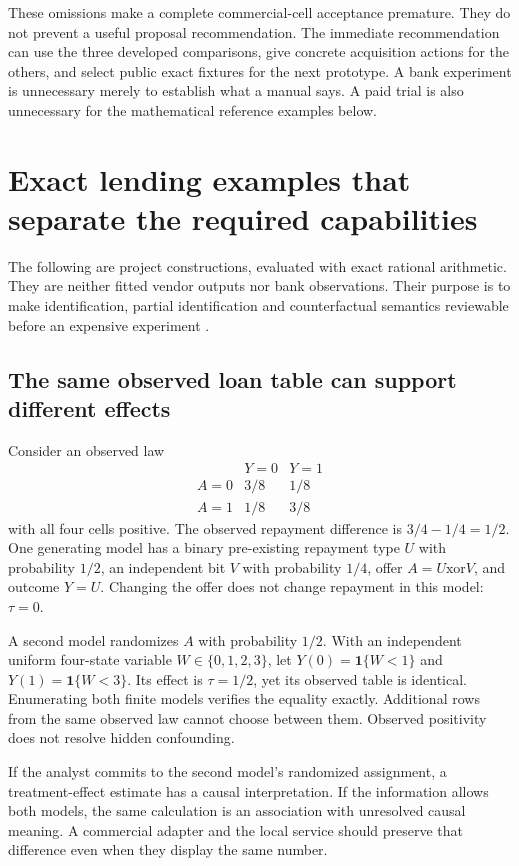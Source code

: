 These omissions make a complete commercial-cell acceptance premature. They do
not prevent a useful proposal recommendation. The immediate recommendation can
use the three developed comparisons, give concrete acquisition actions for
the others, and select public exact fixtures for the next prototype. A bank
experiment is unnecessary merely to establish what a manual says. A paid trial
is also unnecessary for the mathematical reference examples below.

\section{Exact lending examples that separate the required capabilities}

The following are project constructions, evaluated with exact rational
arithmetic. They are neither fitted vendor outputs nor bank observations.
Their purpose is to make identification, partial identification and
counterfactual semantics reviewable before an expensive experiment
\citep{exec13_ci_examples}.

\subsection{The same observed loan table can support different effects}

Consider an observed law
\[
\begin{array}{c|cc}
 &Y=0&Y=1\\\hline
A=0&3/8&1/8\\
A=1&1/8&3/8
\end{array}
\]
with all four cells positive. The observed repayment difference is
$3/4-1/4=1/2$. One generating model has a binary pre-existing repayment type
$U$ with probability $1/2$, an independent bit $V$ with probability $1/4$,
offer $A=U\mathbin{\mathrm{xor}}V$, and outcome $Y=U$. Changing the offer
does not change repayment in this model: $\tau=0$.

A second model randomizes $A$ with probability $1/2$. With an independent
uniform four-state variable $W\in\{0,1,2,3\}$, let
$Y(0)=\mathbf 1\{W<1\}$ and $Y(1)=\mathbf 1\{W<3\}$.
Its effect is $\tau=1/2$, yet its observed table is identical. Enumerating
both finite models verifies the equality exactly. Additional rows from the
same observed law cannot choose between them. Observed positivity does not
resolve hidden confounding.

If the analyst commits to the second model's randomized assignment, a
treatment-effect estimate has a causal interpretation. If the information
allows both models, the same calculation is an association with unresolved
causal meaning. A commercial adapter and the local service should preserve
that difference even when they display the same number.

